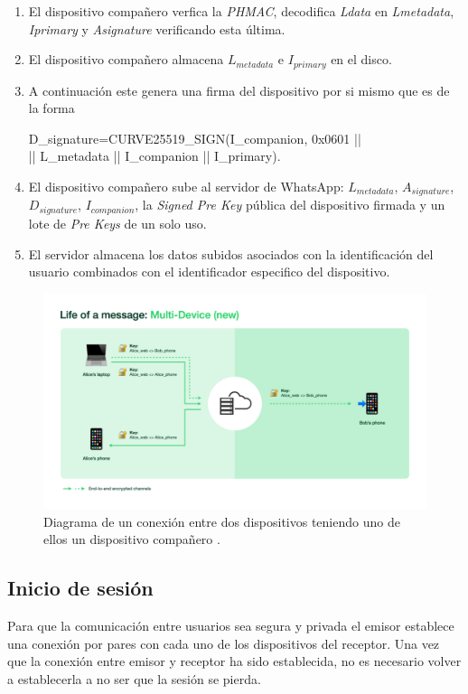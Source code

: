 \begin{description}
\begin{enumerate}
		\item El dispositivo compañero  verfica la \emph{PHMAC}, decodifica \emph{Ldata} en \emph{Lmetadata}, \emph{Iprimary} y \emph{Asignature} verificando esta última.
		\item El dispositivo compañero almacena $L_{metadata}$ e $I_{primary}$ en el disco.
		\item A continuación este genera una firma del dispositivo por si mismo que es de la forma\\ 
		\begin{aligned}
			D_{signature}=CURVE25519\_SIGN(I_{companion}, 0x0601 || \\ || L_{metadata} || I_{companion} || I_{primary}).
		\end{aligned}
		\item El dispositivo compañero sube al servidor de WhatsApp: $L_{metadata}$, $A_{signature}$, $D_{signature}$, $I_{companion}$, la \emph{Signed Pre Key} pública del dispositivo firmada y un lote de \emph{Pre Keys} de un solo uso.
		\item El servidor almacena los datos subidos asociados con la identificación del usuario combinados con el identificador especifico del dispositivo.
	\end{enumerate}
\end{description}


\begin{figure}[htb]
	\centering
	\includegraphics[scale=0.25]{imagenes/what1.png} 
	\caption{Diagrama de un conexión entre dos dispositivos teniendo uno de ellos un dispositivo compañero \cite{what1}.}
	\label{what1}
\end{figure}

\subsection{Inicio de sesión}
Para que la comunicación entre usuarios sea segura y privada el emisor establece una conexión por pares con cada uno de los dispositivos del receptor. Una vez que la conexión entre emisor y receptor ha sido establecida, no es necesario volver a establecerla a no ser que la sesión se pierda.

